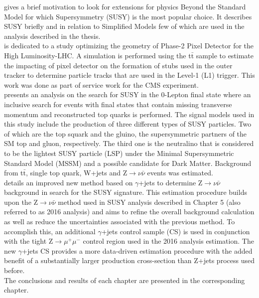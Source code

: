  gives a brief motivation to look for extensions for physics Beyond the Standard Model for which Supersymmetry (SUSY) is the most popular choice. It describes SUSY briefly and in relation to Simplified Models few of which are used in the analysis described in the thesis.\\

 is dedicated to a study optimizing the geometry of Phase-2 Pixel Detector for the High Luminosity-LHC.  A simulation is performed using the t$\bar{\text{t}}$ sample to estimate the impacting of pixel detector on the formation of stubs used in the outer tracker to determine particle tracks that are used in the Level-1 (L1) trigger. This work was done as part of service work for the CMS experiment.\\

 presents an analysis on the search for SUSY in the 0-Lepton final state where an inclusive search for events with final states that contain missing transverse momentum and reconstructed top quarks is performed. The signal models used in this study include the production of three different types of SUSY particles. Two of which are the top squark and the gluino, the supersymmetric partners of the SM top and gluon, respectively. The third one is the neutralino that is considered to be the lightest SUSY particle (LSP) under the Minimal Supersymmetric Standard Model (MSSM) and a possible candidate for Dark Matter. Background from t$\bar{\text{t}}$, single top quark, W+jets and Z$\rightarrow\nu \bar{\nu}$ events was estimated.\\

 details an improved new method based on $\gamma$+jets to determine Z$\rightarrow\nu \bar{\nu}$ background in search for the SUSY signature. This estimation procedure builds upon the Z$\rightarrow\nu \bar{\nu}$ method used in SUSY analysis described in Chapter 5 (also referred to as 2016 analysis) and aims to refine the overall background calculation as well as reduce the uncertainties associated with the previous method. To accomplish this, an additional $\gamma$+jets control sample (CS) is used in conjunction with the tight Z$\rightarrow\mu^{+}\mu^{-}$ control region used in the 2016 analysis estimation. The new  $\gamma$+jets CS provides a more data-driven estimation procedure with the added benefit of a substantially larger production cross-section than Z+jets process used before.\\

The conclusions and results of each chapter are presented in the corresponding chapter.\\

